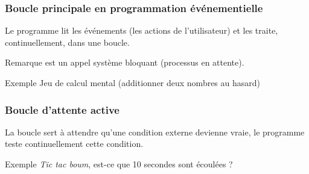 \documentclass[xcolor=pdftex,svgnames,table]{beamer}
\begin{document}
\begin{frame}[fragile]
\frametitle{Boucle principale en programmation événementielle}

Le programme lit les événements
(les actions de l'utilisateur) et les traite, continuellement, dans
une boucle.

\begin{block}{Remarque}
  est un \alert{appel système bloquant} (processus en attente).
\end{block}
\begin{block}{Exemple}
Jeu de calcul mental (additionner deux nombres au hasard)\nowrite
\end{block}



\end{frame}

\begin{frame}[fragile]
  \frametitle{Boucle d'attente active}
La boucle sert à attendre qu'une condition externe devienne vraie, le
programme teste continuellement cette condition.
\pause
\begin{block}{Exemple}
  \emph{Tic tac boum}, est-ce que 10 secondes sont écoulées ?\nowrite
\end{block}


\end{frame}

\end{document}
